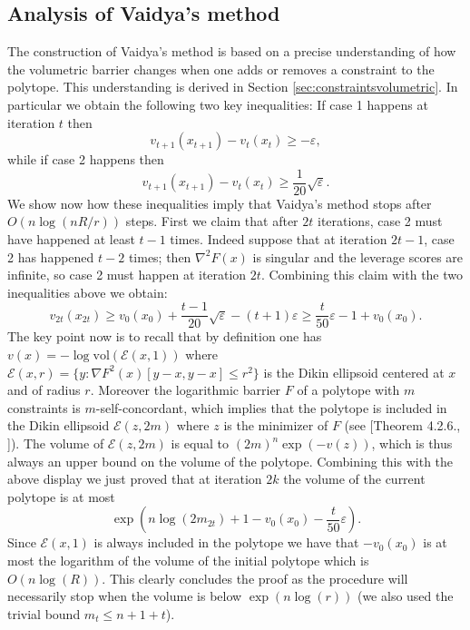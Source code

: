 \documentclass[openany]{now}
\newcommand{\cE}{\mathcal{E}}
\renewcommand{\epsilon}{\varepsilon}
\begin{document}
\subsection{Analysis of Vaidya's method} \label{sec:analysis}
The construction of Vaidya's method is based on a precise understanding of how the volumetric barrier changes when one adds or removes a constraint to the polytope. This understanding is derived in Section \ref{sec:constraintsvolumetric}. In particular we obtain the following two key inequalities: If case 1 happens at iteration $t$ then
\begin{equation} \label{eq:analysis1}
v_{t+1}(x_{t+1}) - v_t(x_t) \geq - \epsilon ,
\end{equation}
while if case 2 happens then 
\begin{equation} \label{eq:analysis2}
v_{t+1}(x_{t+1}) - v_t(x_t) \geq \frac{1}{20} \sqrt{\epsilon} .
\end{equation}
We show now how these inequalities imply that Vaidya's method stops after $O(n \log(n R/r))$ steps. First we claim that after $2t$ iterations, case 2 must have happened at least $t-1$ times. Indeed suppose that at iteration $2t-1$, case 2 has happened $t-2$ times; then $\nabla^2 F(x)$ is singular and the leverage scores are infinite, so case 2 must happen at iteration $2t$. Combining this claim with the two inequalities above we obtain:
$$v_{2t}(x_{2t}) \geq v_0(x_0) + \frac{t-1}{20} \sqrt{\epsilon} - (t+1) \epsilon \geq \frac{t}{50} \epsilon - 1 +v_0(x_0) . $$
The key point now is to recall that by definition one has $v(x) = - \log \mathrm{vol}(\cE(x,1))$ where $\cE(x,r) = \{y : \nabla F^2(x)[y-x,y-x] \leq r^2\}$ is the Dikin ellipsoid centered at $x$ and of radius $r$. Moreover the logarithmic barrier $F$ of a polytope with $m$ constraints is $m$-self-concordant, which implies that the polytope is included in the Dikin ellipsoid $\cE(z, 2m)$ where $z$ is the minimizer of $F$ (see [Theorem 4.2.6., \cite{Nes04}]). The volume of $\cE(z, 2m)$ is equal to $(2m)^n \exp(-v(z))$, which is thus always an upper bound on the volume of the polytope. Combining this with the above display we just proved that at iteration $2k$ the volume of the current polytope is at most
$$\exp \left(n \log(2m_{2t}) + 1 - v_0(x_0) - \frac{t}{50} \epsilon \right) .$$
Since $\cE(x,1)$ is always included in the polytope we have that $- v_0(x_0)$ is at most the logarithm of the volume of the initial polytope which is $O(n \log(R))$. This clearly concludes the proof as the procedure will necessarily stop when the volume is below $\exp(n \log(r))$ (we also used the trivial bound $m_t \leq n+1+t$).
\end{document}
